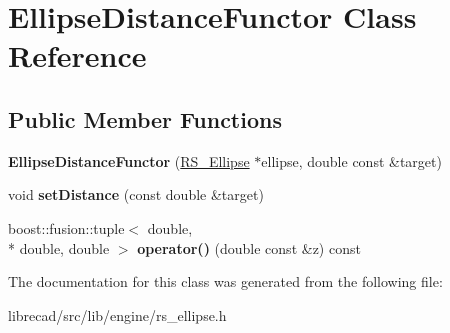 \hypertarget{classEllipseDistanceFunctor}{\section{Ellipse\-Distance\-Functor Class Reference}
\label{classEllipseDistanceFunctor}
}
\subsection*{Public Member Functions}
\begin{DoxyCompactItemize}
\item 
\hypertarget{classEllipseDistanceFunctor_a9fa37a1809716f0e234d7f20755b5c8a}{{\bfseries Ellipse\-Distance\-Functor} (\hyperlink{classRS__Ellipse}{R\-S\-\_\-\-Ellipse} $\ast$ellipse, double const \&target)}\label{classEllipseDistanceFunctor_a9fa37a1809716f0e234d7f20755b5c8a}

\item 
\hypertarget{classEllipseDistanceFunctor_a9fc9e4ac96c8d8e049e0a6cb7fd70742}{void {\bfseries set\-Distance} (const double \&target)}\label{classEllipseDistanceFunctor_a9fc9e4ac96c8d8e049e0a6cb7fd70742}

\item 
\hypertarget{classEllipseDistanceFunctor_aba54db7b66df5c8275dd81cfaac29310}{boost\-::fusion\-::tuple$<$ double, \\*
double, double $>$ {\bfseries operator()} (double const \&z) const }\label{classEllipseDistanceFunctor_aba54db7b66df5c8275dd81cfaac29310}

\end{DoxyCompactItemize}


The documentation for this class was generated from the following file\-:\begin{DoxyCompactItemize}
\item 
librecad/src/lib/engine/rs\-\_\-ellipse.\-h\end{DoxyCompactItemize}
